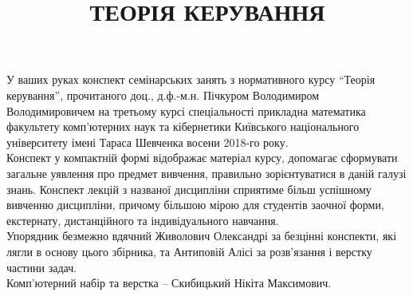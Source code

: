 \documentclass[a5paper, 10pt]{article}
\title{{\Huge ТЕОРІЯ КЕРУВАННЯ}}
\date{}
\theoremstyle{definition}
\numberwithin{equation}{section}
\begin{document}
\maketitle \thispagestyle{empty} \newpage 

У ваших руках конспект семінарських занять з нормативного курсу ``Теорія керування'', прочитаного доц., д.ф.-м.н. Пічкуром Володимиром Володимировичем на третьому курсі спеціальності прикладна математика факультету комп\-'ю\-тер\-них наук та кібернетики Київського національного університету імені Тараса Шевченка восени 2018-го року. \\

Конспект у компактній формі відображає матеріал курсу, допомагає сформувати загальне уявлення про предмет вивчення, правильно зорієнтуватися в даній галузі знань. Конспект лекцій з названої дисципліни сприятиме більш успішному вивченню дисципліни, причому більшою мірою для студентів заочної форми, екстернату, дистанційного та індивідуального навчання. \\

Упорядник безмежно вдячний Живолович Олександрі за безцінні конспекти, які лягли в основу цього збірника, та Антиповій Алісі за розв'язання і верстку частини задач. \\

Комп\-'ю\-тер\-ний набір та верстка -- Скибицький Нікіта Максимович.

\newpage

\tableofcontents \newpage

 \newpage

 \newpage

 \newpage

 \newpage

 \newpage

 \newpage

 \newpage

 \newpage

 \newpage

 \newpage

 \newpage

 \newpage

 \newpage


\end{document}
